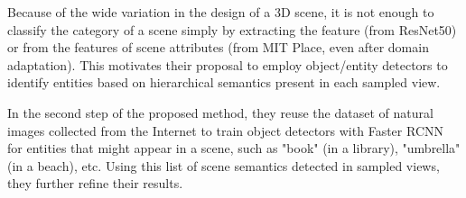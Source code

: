 \documentclass[../main.tex]{subfiles}
\begin{document}
	Because of the wide variation in the design of a 3D scene, it is not enough to classify the category of a scene simply by extracting the feature (from ResNet50) or from the features of scene attributes (from MIT Place, even after domain adaptation). This motivates their proposal to employ object/entity detectors to identify entities based on hierarchical semantics present in each sampled view.
	
	In the second step of the proposed method, they reuse the dataset of natural images collected from the Internet to train object detectors with Faster RCNN \cite{DBLP:journals/corr/RenHG015} for entities that might appear in a scene, such as "book" (in a library), "umbrella" (in a beach), etc. Using this  list of scene semantics detected in sampled views, they further refine their results.
\end{document}
